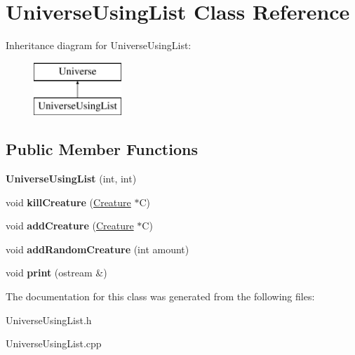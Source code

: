 \hypertarget{class_universe_using_list}{}\section{Universe\+Using\+List Class Reference}
\label{class_universe_using_list}
Inheritance diagram for Universe\+Using\+List\+:\begin{figure}[H]
\begin{center}
\leavevmode
\includegraphics[height=2.000000cm]{class_universe_using_list}
\end{center}
\end{figure}
\subsection*{Public Member Functions}
\begin{DoxyCompactItemize}
\item 
{\bfseries Universe\+Using\+List} (int, int)\hypertarget{class_universe_using_list_a690190032d86eadad922b33166d6d11a}{}\label{class_universe_using_list_a690190032d86eadad922b33166d6d11a}

\item 
void {\bfseries kill\+Creature} (\hyperlink{class_creature}{Creature} $\ast$C)\hypertarget{class_universe_using_list_ad5ae1ddeb1ea11111e506373de5364d8}{}\label{class_universe_using_list_ad5ae1ddeb1ea11111e506373de5364d8}

\item 
void {\bfseries add\+Creature} (\hyperlink{class_creature}{Creature} $\ast$C)\hypertarget{class_universe_using_list_a936d1a839b5cd80f9715c7f2e2daf1da}{}\label{class_universe_using_list_a936d1a839b5cd80f9715c7f2e2daf1da}

\item 
void {\bfseries add\+Random\+Creature} (int amount)\hypertarget{class_universe_using_list_a77570a26fbc9bc108c94ea815ce4bb67}{}\label{class_universe_using_list_a77570a26fbc9bc108c94ea815ce4bb67}

\item 
void {\bfseries print} (ostream \&)\hypertarget{class_universe_using_list_a9cbe5a6b7497005e60131907a3aa8120}{}\label{class_universe_using_list_a9cbe5a6b7497005e60131907a3aa8120}

\end{DoxyCompactItemize}


The documentation for this class was generated from the following files\+:\begin{DoxyCompactItemize}
\item 
Universe\+Using\+List.\+h\item 
Universe\+Using\+List.\+cpp\end{DoxyCompactItemize}
